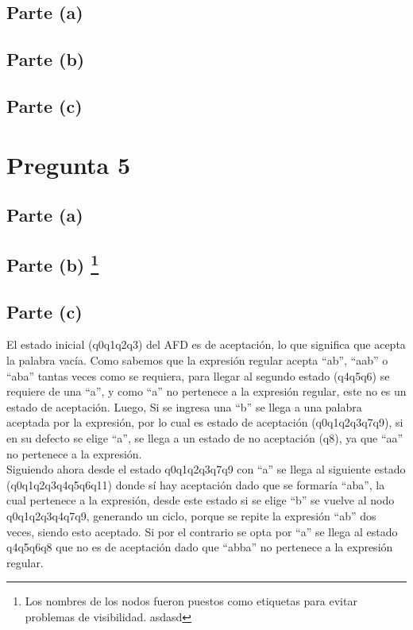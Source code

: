 \documentclass[11pt,letterpaper]{article}
\begin{document}
\subsection{Parte (a)}
\subsection{Parte (b)}
\subsection{Parte (c)}

\section{Pregunta 5}
\subsection{Parte (a)}
\renewcommand{\thefootnote}{\fnsymbol{footnote}}
\subsection{Parte (b) \protect\footnote{Los nombres de los nodos fueron puestos como etiquetas para evitar problemas de visibilidad. asdasd}}


\newpage
\subsection{Parte (c)}

El estado inicial (q0q1q2q3) del AFD es de aceptación, lo que significa que acepta la palabra vacía. Como sabemos que la expresión regular acepta “ab”, “aab” o “aba” tantas veces como se requiera, para llegar al segundo estado (q4q5q6) se requiere de una “a”, y como “a” no pertenece a la expresión regular, este no es un estado de aceptación. Luego, Si se ingresa una “b” se llega a una palabra aceptada por la expresión, por lo cual es estado de aceptación (q0q1q2q3q7q9), si en su defecto se elige “a”, se llega a un estado de no aceptación (q8), ya que “aa” no pertenece a la expresión. \\

Siguiendo ahora desde el estado q0q1q2q3q7q9 con “a” se llega al siguiente estado (q0q1q2q3q4q5q6q11) donde sí hay aceptación dado que se formaría “aba”, la cual pertenece a la expresión, desde este estado si se elige “b” se vuelve al nodo q0q1q2q3q4q7q9, generando un ciclo, porque se repite la expresión “ab” dos veces, siendo esto aceptado. Si por el contrario se opta por “a” se llega al estado q4q5q6q8 que no es de aceptación dado que “abba” no pertenece a la expresión regular. \\
\end{document}
